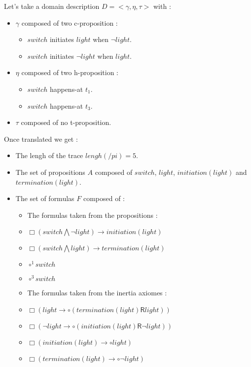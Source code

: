 Let's take a domain description $D=<\gamma,\eta,\tau>$ with :
\begin{itemize}
  \item $\gamma$ composed of two c-proposition :
  \begin{itemize}
    \item $switch$ initiates $light$ when $\neg light$.
    \item $switch$ initiates $\neg light$ when $light$.
  \end{itemize}
  \item $\eta$ composed of two h-proposition :
  \begin{itemize}
    \item $switch$ happens-at $t_1$.
    \item $switch$ happens-at $t_3$.
  \end{itemize}
  \item $\tau$ composed of no t-proposition.
\end{itemize}

Once translated we get :
\begin{itemize}
  \item The lengh of the trace $lengh(/pi)=5$.
  \item The set of propositions $A$ composed of $switch$, $light$, $initiation(light)$ and $termination(light)$.
  \item The set of formulas $F$ composed of :
  \begin{itemize}
    \item The formulas taken from the propositions :
    \item $\Box(switch\bigwedge \neg light)\rightarrow initiation(light)$
    \item $\Box(switch\bigwedge light)\rightarrow termination(light)$
    \item $\circ^{1}switch$
    \item $\circ^{3}switch$
    \item The formulas taken from the inertia axiomes :
    \item $\Box(light\rightarrow\circ (termination(light) \mathbin{\bm{\mathsf{R}}} light))$
    \item $\Box(\neg light\rightarrow\circ (initiation(light) \mathbin{\bm{\mathsf{R}}} \neg light))$
    \item $\Box(initiation(light)\rightarrow\circ light)$
    \item $\Box(termination(light)\rightarrow\circ \neg light)$
  \end{itemize}
\end{itemize}

